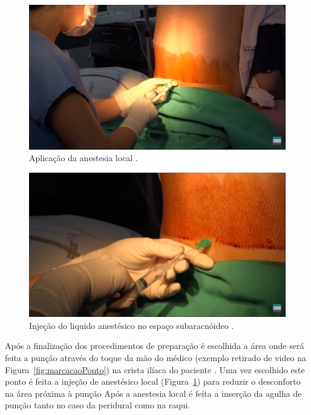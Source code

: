 \begin{figure}[h!]
    \centering
    \includegraphics[scale=0.35,keepaspectratio=true]{figuras/1.AnestesiaLocal.png}
    \caption{Aplicação da anestesia local \cite{Londero2018}.}
    \label{fig:anestesiaLocal}
\end{figure}

\begin{figure}[h!]
    \centering
    \includegraphics[scale=0.35,keepaspectratio=true]{figuras/4.InjecaoAnestesico.png}
    \caption{Injeção do liquido anestésico no espaço subaracnóideo  \cite{Londero2018}.}
    \label{fig:injecaoAnestesico}
\end{figure}

Após a finalização dos procedimentos de preparação é escolhida a área onde será feita a punção através do toque da mão do médico (exemplo retirado de video na Figura~\ref{fig:marcacaoPonto}) na crista ilíaca do paciente \cite{Helayel2010,Isaacs2015}. Uma vez escolhido este ponto é feita a injeção de anestésico local (Figura~\ref{fig:anestesiaLocal}) para reduzir o desconforto na área próxima à punção \cite{Sedicias2018} Após a anestesia local é feita a inserção da agulha de punção tanto no caso da peridural como na raqui.

